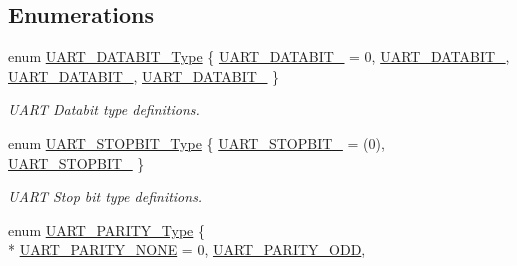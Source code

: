 \subsection*{Enumerations}
\begin{DoxyCompactItemize}
\item 
enum \hyperlink{group___u_a_r_t___public___types_ga2b8c6f7ae8c1ff3557b3c9b67be69648}{U\+A\+R\+T\+\_\+\+D\+A\+T\+A\+B\+I\+T\+\_\+\+Type} \{ \hyperlink{group___u_a_r_t___public___types_gga2b8c6f7ae8c1ff3557b3c9b67be69648ab8edf3c4ac9cd19a77a78046c8d7c21d}{U\+A\+R\+T\+\_\+\+D\+A\+T\+A\+B\+I\+T\+\_} = 0, 
\hyperlink{group___u_a_r_t___public___types_gga2b8c6f7ae8c1ff3557b3c9b67be69648a28d637fedc642319e85aa69ee7460143}{U\+A\+R\+T\+\_\+\+D\+A\+T\+A\+B\+I\+T\+\_}, 
\hyperlink{group___u_a_r_t___public___types_gga2b8c6f7ae8c1ff3557b3c9b67be69648a64eeea6c1646790ebd4acc2557aaf393}{U\+A\+R\+T\+\_\+\+D\+A\+T\+A\+B\+I\+T\+\_}, 
\hyperlink{group___u_a_r_t___public___types_gga2b8c6f7ae8c1ff3557b3c9b67be69648a5a1857edfe041a41ef5e7f098be8ead2}{U\+A\+R\+T\+\_\+\+D\+A\+T\+A\+B\+I\+T\+\_}
 \}\begin{DoxyCompactList}\small\item\em U\+A\+RT Databit type definitions. \end{DoxyCompactList}
\item 
enum \hyperlink{group___u_a_r_t___public___types_gaa539c23e185a76d77b3c9efc3d62b68c}{U\+A\+R\+T\+\_\+\+S\+T\+O\+P\+B\+I\+T\+\_\+\+Type} \{ \hyperlink{group___u_a_r_t___public___types_ggaa539c23e185a76d77b3c9efc3d62b68cab9c26fe02b2f4407d7106ea4da1f74ab}{U\+A\+R\+T\+\_\+\+S\+T\+O\+P\+B\+I\+T\+\_} = (0), 
\hyperlink{group___u_a_r_t___public___types_ggaa539c23e185a76d77b3c9efc3d62b68cacdc53828459d69a364db0fc85c4dd7b1}{U\+A\+R\+T\+\_\+\+S\+T\+O\+P\+B\+I\+T\+\_}
 \}\begin{DoxyCompactList}\small\item\em U\+A\+RT Stop bit type definitions. \end{DoxyCompactList}
\item 
enum \hyperlink{group___u_a_r_t___public___types_ga66fa9d836eb6f7035939427e6f8cc318}{U\+A\+R\+T\+\_\+\+P\+A\+R\+I\+T\+Y\+\_\+\+Type} \{ \\*
\hyperlink{group___u_a_r_t___public___types_gga66fa9d836eb6f7035939427e6f8cc318aa80d2d8ea61454045ebe71d155e85b3d}{U\+A\+R\+T\+\_\+\+P\+A\+R\+I\+T\+Y\+\_\+\+N\+O\+NE} = 0, 
\hyperlink{group___u_a_r_t___public___types_gga66fa9d836eb6f7035939427e6f8cc318ad90cc425f5ba447773a44a75be6593e2}{U\+A\+R\+T\+\_\+\+P\+A\+R\+I\+T\+Y\+\_\+\+O\+DD}, 

\end{DoxyCompactItemize}
